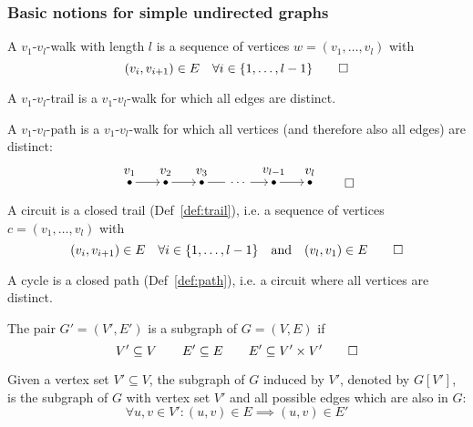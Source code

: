 \subsubsection{Basic notions for simple undirected graphs}
\begin{definition}[Walk]\label{def:walk}
A \(v_1\)-\(v_l\)-walk with length \(l\) is a sequence of vertices \(w = (v_1, \ldots, v_l)\) with 
\[
  (v_i, v_{i+1}) \in E \quad \forall i \in \{1, \ldots, l-1\} \qedhere
\]
\end{definition}
\begin{definition}[Trail]\label{def:trail}
  A \(v_1\)-\(v_l\)-trail is a \(v_1\)-\(v_l\)-walk for which all edges are distinct.
\end{definition}
\begin{definition}[Path]\label{def:path}
  A \(v_1\)-\(v_l\)-path is a \(v_1\)-\(v_l\)-walk for which all vertices (and therefore also all edges) are distinct:
\[
\begin{tikzpicture}
  \tikzset{
dot/.style = {circle, fill, inner sep=1.2pt, outer sep=3pt}
}
\node[dot, label={[yshift=-3pt]above:$v_1$}] (v1) at (0,0) {};
\node[dot, label={[yshift=-3pt]above:$v_2$}] (v2) at (1,0) {};
\node[dot, label={[yshift=-3pt]above:$v_3$}] (v3) at (2,0) {};
\node[] (v4) at (3,0) {$\ldots$};
\node[dot, label={[yshift=-3pt]above:$v_{l-1}$}] (vlm1) at (4,0) {};
\node[dot, label={[yshift=-3pt]above:$v_l$}] (vl) at (5,0) {};
\draw[->] (v1) -- (v2);
\draw[->] (v2) -- (v3);
\draw[] (v3) -- (2.65,0);
\draw[->] (3.35,0) -- (vlm1);
\draw[->] (vlm1) -- (vl);
\end{tikzpicture} \qedhere
\]
\end{definition}
\begin{definition}[Circuit]\label{def:circuit}
  A circuit is a closed trail (Def~\ref{def:trail}), i.e. a sequence of vertices \(c = (v_1, \ldots, v_l)\) with
\[
  (v_i, v_{i+1}) \in E \quad\forall i \in \{1, \ldots, l-1\} \quad \text{and} \quad
  (v_l, v_1) \in E \qedhere
\]
\end{definition}
\begin{definition}[Cycle]\label{def:cycle}
  A cycle is a closed path (Def~\ref{def:path}), i.e. a circuit where all vertices are distinct.
\end{definition}
\begin{definition}[Subgraph]\label{def:subgraph}
The pair \(G'=(V',E')\) is a subgraph of \(G=(V,E)\) if
\[
  V' \subseteq V \qquad E' \subseteq E \qquad E' \subseteq V'\times V' \qedhere
\]
\end{definition}
Given a vertex  set \(V' \subseteq V\), the subgraph of \(G\) induced by \(V'\), denoted by \(G[V']\), is the subgraph of \(G\) with vertex set \(V'\) and all possible edges which are also in \(G\):
\[
  \forall u,v\in V': (u,v)\in E \implies (u,v)\in E'
\]


